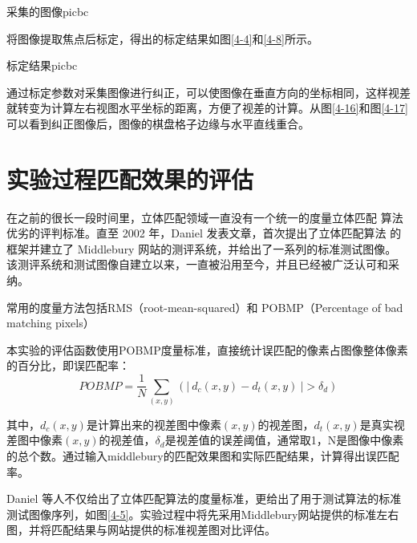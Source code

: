\begin{pics}[h]{采集的图像}{picbc}
\end{pics}
将图像提取焦点后标定，得出的标定结果如图\ref{4-4}和\ref{4-8}所示。
\begin{pics}[h]{标定结果}{picbc}
\end{pics}

通过标定参数对采集图像进行纠正，可以使图像在垂直方向的坐标相同，这样视差就转变为计算左右视图水平坐标的距离，方便了视差的计算。从图\ref{4-16}和图\ref{4-17}可以看到纠正图像后，图像的棋盘格子边缘与水平直线重合。

\section{实验过程匹配效果的评估}

在之前的很长一段时间里，立体匹配领域一直没有一个统一的度量立体匹配
算法优劣的评判标准。直至 2002 年，Daniel 发表文章，首次提出了立体匹配算法
的框架并建立了 Middlebury 网站的测评系统，并给出了一系列的标准测试图像。
该测评系统和测试图像自建立以来，一直被沿用至今，并且已经被广泛认可和采
纳。

常用的度量方法包括RMS（root-mean-squared）和 POBMP（Percentage of bad matching pixels）

本实验的评估函数使用POBMP度量标准，直接统计误匹配的像素占图像整体像素的百分比，即误匹配率：
\begin{equation}
POBMP=\frac{1}{N}\sum_{(x,y)} (|\ d_{c}(x,y)-d_{t}(x,y)\ |>\delta _{d})
\end{equation}

其中，$d_{c}(x,y)$是计算出来的视差图中像素$(x,y)$的视差图，$d_{t}(x,y)$是真实视差图中像素$(x,y)$的视差值，$\delta _{d}$是视差值的误差阈值，通常取1，N是图像中像素的总个数。通过输入middlebury的匹配效果图和实际匹配结果，计算得出误匹配率。

Daniel 等人不仅给出了立体匹配算法的度量标准，更给出了用于测试算法的标准测试图像序列，如图\ref{4-5}。实验过程中将先采用Middlebury网站提供的标准左右图，并将匹配结果与网站提供的标准视差图对比评估。


